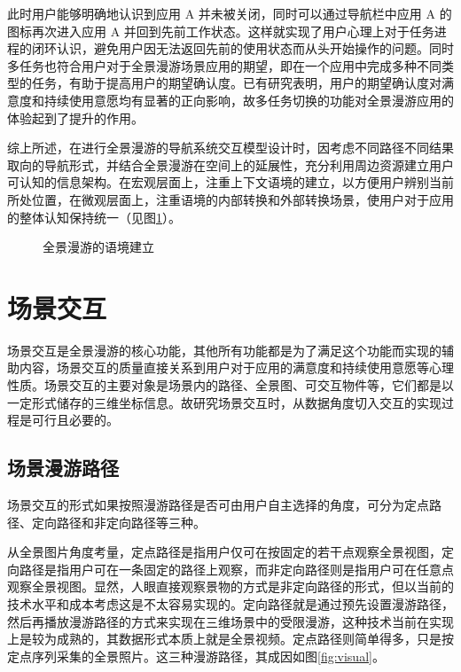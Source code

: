 此时用户能够明确地认识到应用 A 并未被关闭，同时可以通过导航栏中应用 A 的图标再次进入应用 A 并回到先前工作状态。这样就实现了用户心理上对于任务进程的闭环认识，避免用户因无法返回先前的使用状态而从头开始操作的问题。同时多任务也符合用户对于全景漫游场景应用的期望，即在一个应用中完成多种不同类型的任务，有助于提高用户的期望确认度。已有研究表明，用户的期望确认度对满意度和持续使用意愿均有显著的正向影响，故多任务切换的功能对全景漫游应用的体验起到了提升的作用。

综上所述，在进行全景漫游的导航系统交互模型设计时，因考虑不同路径不同结果取向的导航形式，并结合全景漫游在空间上的延展性，充分利用周边资源建立用户可认知的信息架构。在宏观层面上，注重上下文语境的建立，以方便用户辨别当前所处位置，在微观层面上，注重语境的内部转换和外部转换场景，使用户对于应用的整体认知保持统一（见图\ref{fig:env}）。

\begin{figure}[htp]
\centering
{}
\caption{全景漫游的语境建立}
\label{fig:env}
\end{figure}

\section{场景交互}

场景交互是全景漫游的核心功能，其他所有功能都是为了满足这个功能而实现的辅助内容，场景交互的质量直接关系到用户对于应用的满意度和持续使用意愿等心理性质。场景交互的主要对象是场景内的路径、全景图、可交互物件等，它们都是以一定形式储存的三维坐标信息。故研究场景交互时，从数据角度切入交互的实现过程是可行且必要的。

\subsection{场景漫游路径}
场景交互的形式如果按照漫游路径是否可由用户自主选择的角度，可分为定点路径、定向路径和非定向路径等三种。

从全景图片角度考量，定点路径是指用户仅可在按固定的若干点观察全景视图，定向路径是指用户可在一条固定的路径上观察，而非定向路径则是指用户可在任意点观察全景视图。显然，人眼直接观察景物的方式是非定向路径的形式，但以当前的技术水平和成本考虑这是不太容易实现的。定向路径就是通过预先设置漫游路径，然后再播放漫游路径的方式来实现在三维场景中的受限漫游，这种技术当前在实现上是较为成熟的，其数据形式本质上就是全景视频。定点路径则简单得多，只是按定点序列采集的全景照片。这三种漫游路径，其成因如图\ref{fig:visual}。

